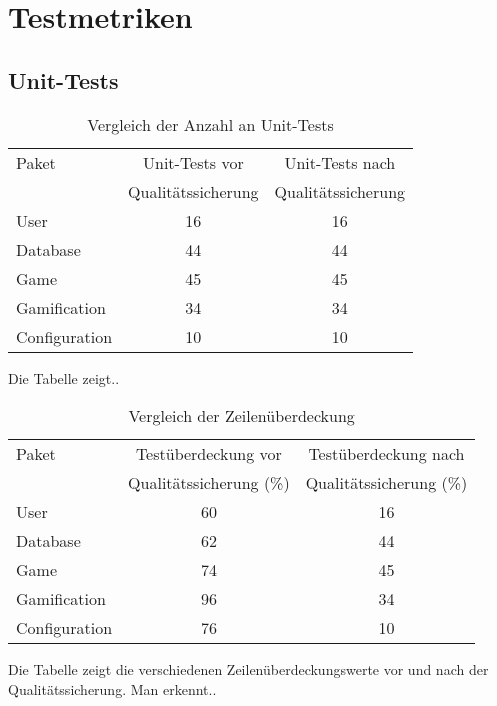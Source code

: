 \documentclass[a4paper]{scrreprt}
\begin{document}
    \chapter{Testmetriken}
        \section{Unit-Tests}

    \begin{table}[h]
        \centering
        \begin{tabular}{ | l | c | c | }
            \hline
            Paket & Unit-Tests vor & Unit-Tests nach  \\
            & Qualitätssicherung & Qualitätssicherung \\ \hline
            User & 16 & 16 \\
            Database & 44 & 44 \\
            Game & 45 & 45 \\
            Gamification & 34 & 34 \\
            Configuration & 10 & 10 \\
            \hline
        \end{tabular}
        \caption{Vergleich der Anzahl an Unit-Tests}
    \end{table}%

    Die Tabelle zeigt..

    \begin{table}[h]
        \centering
        \begin{tabular}{ | l | c | c | }
            \hline
            Paket & Testüberdeckung vor  & Testüberdeckung nach \\
            & Qualitätssicherung (\%)  & Qualitätssicherung (\%) \\ \hline
            User & 60 & 16 \\
            Database & 62 & 44 \\
            Game & 74 & 45 \\
            Gamification & 96 & 34 \\
            Configuration & 76 & 10 \\
            \hline
        \end{tabular}
        \caption{Vergleich der Zeilenüberdeckung}
    \end{table}%

    Die Tabelle zeigt die verschiedenen Zeilenüberdeckungswerte vor und nach der Qualitätssicherung. Man erkennt..
\end{document}
